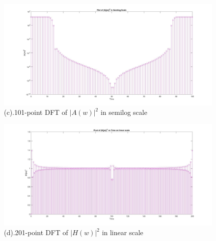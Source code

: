 \documentclass[a4paper, 20pt]{article}
\begin{document}
\begin{figure}[ht]%
\centering
\includegraphics[width=1.3\textwidth]{1.jpg}%
\caption{(c).101-point DFT of $|A(w)|^2$ in semilog scale}%
\label{fig:proto}%
\end{figure}%
\begin{figure}[th]%
\centering
\includegraphics[width=1.3\textwidth]{2.jpg}%
\caption{(d).201-point DFT of $|H(w)|^2$ in linear scale}%
\label{fig:proto}%
\end{figure}%
\end{document}
